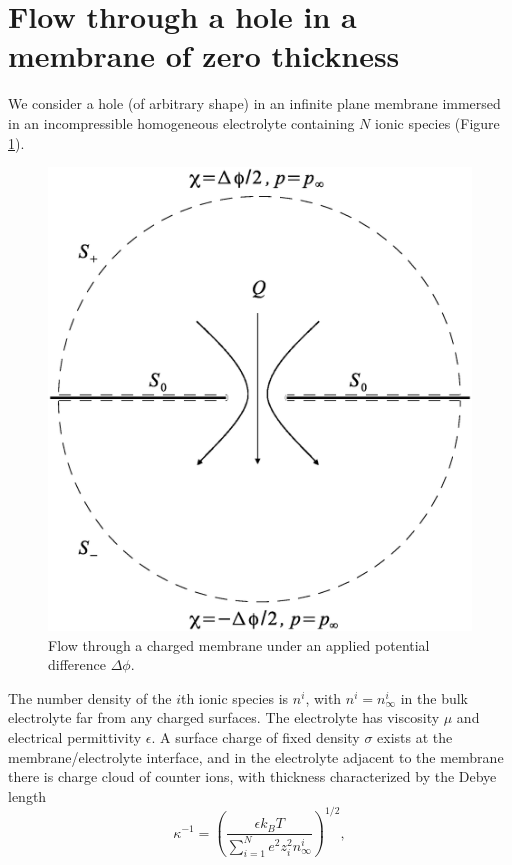 \section{Flow through a hole in a membrane of zero thickness}
\label{sec:zeroThick}
We consider a hole (of arbitrary shape) in an infinite plane membrane immersed in an incompressible homogeneous electrolyte containing $N$ ionic species (Figure \ref{fig:sketch}). 
\begin{figure}[ht]
\centering
\includegraphics[scale=0.5]{zero_thickness/figure1.eps}
\caption{Flow through a charged membrane under an applied potential difference $\Delta\phi$.}
\label{fig:sketch}
\end{figure}
The number density of the $i$th ionic species is $n^i$, with $n^i=n_\infty^i$ in the bulk electrolyte far from any charged surfaces. The electrolyte has viscosity $\mu$ and electrical permittivity $\epsilon$. A surface charge of fixed density $\sigma$ exists at the membrane/electrolyte interface, and in the electrolyte adjacent to the membrane there is charge cloud of counter ions, with thickness characterized by the Debye length
\begin{equation}
\kappa^{-1}=\left(\frac{\epsilon k_BT}{\sum_{i=1}^N e^2 z_i^2n_\infty^i}\right)^{1/2},
\end{equation}
